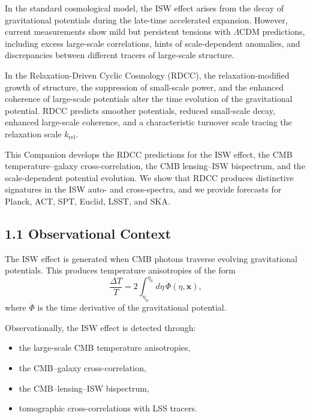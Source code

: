 \documentclass[11pt,a4paper]{article}
\begin{document}
In the standard cosmological model, the ISW effect arises from the decay of gravitational 
potentials during the late-time accelerated expansion. However, current measurements show 
mild but persistent tensions with $\Lambda$CDM predictions, including excess large-scale 
correlations, hints of scale-dependent anomalies, and discrepancies between different 
tracers of large-scale structure.

In the Relaxation-Driven Cyclic Cosmology (RDCC), the relaxation-modified growth of 
structure, the suppression of small-scale power, and the enhanced coherence of large-scale 
potentials alter the time evolution of the gravitational potential. RDCC predicts smoother 
potentials, reduced small-scale decay, enhanced large-scale coherence, and a characteristic 
turnover scale tracing the relaxation scale $k_{\mathrm{rel}}$.

This Companion develops the RDCC predictions for the ISW effect, the CMB temperature–galaxy 
cross-correlation, the CMB lensing–ISW bispectrum, and the scale-dependent potential 
evolution. We show that RDCC produces distinctive signatures in the ISW auto- and 
cross-spectra, and we provide forecasts for Planck, ACT, SPT, Euclid, LSST, and SKA.

\subsection*{1.1 Observational Context}

The ISW effect is generated when CMB photons traverse evolving gravitational potentials. 
This produces temperature anisotropies of the form
\begin{equation}
    \frac{\Delta T}{T}
    = 2 \int_{\eta_{\mathrm{ls}}}^{\eta_{0}} d\eta\,
      \dot{\Phi}(\eta,\mathbf{x}),
\end{equation}
where $\dot{\Phi}$ is the time derivative of the gravitational potential.

Observationally, the ISW effect is detected through:

\begin{itemize}
    \item the large-scale CMB temperature anisotropies,
    \item the CMB–galaxy cross-correlation,
    \item the CMB–lensing–ISW bispectrum,
    \item tomographic cross-correlations with LSS tracers.
\end{itemize}
\end{document}
